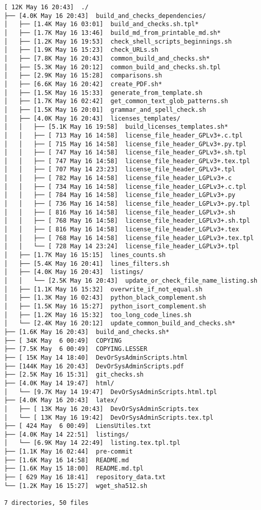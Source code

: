 \documentclass{article}
\begin{document}
\begin{verbatim}
[ 12K May 16 20:43]  ./
├── [4.0K May 16 20:43]  build_and_checks_dependencies/
│   ├── [1.4K May 16 03:01]  build_and_checks.sh.tpl*
│   ├── [1.7K May 16 13:46]  build_md_from_printable_md.sh*
│   ├── [1.2K May 16 19:53]  check_shell_scripts_beginnings.sh
│   ├── [1.9K May 16 15:23]  check_URLs.sh
│   ├── [7.8K May 16 20:43]  common_build_and_checks.sh*
│   ├── [5.3K May 16 20:12]  common_build_and_checks.sh.tpl
│   ├── [2.9K May 16 15:28]  comparisons.sh
│   ├── [6.6K May 16 20:42]  create_PDF.sh*
│   ├── [1.5K May 16 15:33]  generate_from_template.sh
│   ├── [1.7K May 16 02:42]  get_common_text_glob_patterns.sh
│   ├── [1.5K May 16 20:01]  grammar_and_spell_check.sh
│   ├── [4.0K May 16 20:43]  licenses_templates/
│   │   ├── [5.1K May 16 19:58]  build_licenses_templates.sh*
│   │   ├── [ 713 May 16 14:58]  license_file_header_GPLv3+.c.tpl
│   │   ├── [ 715 May 16 14:58]  license_file_header_GPLv3+.py.tpl
│   │   ├── [ 747 May 16 14:58]  license_file_header_GPLv3+.sh.tpl
│   │   ├── [ 747 May 16 14:58]  license_file_header_GPLv3+.tex.tpl
│   │   ├── [ 707 May 14 23:23]  license_file_header_GPLv3+.tpl
│   │   ├── [ 782 May 16 14:58]  license_file_header_LGPLv3+.c
│   │   ├── [ 734 May 16 14:58]  license_file_header_LGPLv3+.c.tpl
│   │   ├── [ 784 May 16 14:58]  license_file_header_LGPLv3+.py
│   │   ├── [ 736 May 16 14:58]  license_file_header_LGPLv3+.py.tpl
│   │   ├── [ 816 May 16 14:58]  license_file_header_LGPLv3+.sh
│   │   ├── [ 768 May 16 14:58]  license_file_header_LGPLv3+.sh.tpl
│   │   ├── [ 816 May 16 14:58]  license_file_header_LGPLv3+.tex
│   │   ├── [ 768 May 16 14:58]  license_file_header_LGPLv3+.tex.tpl
│   │   └── [ 728 May 14 23:24]  license_file_header_LGPLv3+.tpl
│   ├── [1.7K May 16 15:15]  lines_counts.sh
│   ├── [5.4K May 16 20:41]  lines_filters.sh
│   ├── [4.0K May 16 20:43]  listings/
│   │   └── [2.5K May 16 20:43]  update_or_check_file_name_listing.sh
│   ├── [1.1K May 16 15:32]  overwrite_if_not_equal.sh
│   ├── [1.3K May 16 02:43]  python_black_complement.sh
│   ├── [1.5K May 16 15:27]  python_isort_complement.sh
│   ├── [1.2K May 16 15:32]  too_long_code_lines.sh
│   └── [2.4K May 16 20:12]  update_common_build_and_checks.sh*
├── [1.6K May 16 20:43]  build_and_checks.sh*
├── [ 34K May  6 00:49]  COPYING
├── [7.5K May  6 00:49]  COPYING.LESSER
├── [ 15K May 14 18:40]  DevOrSysAdminScripts.html
├── [144K May 16 20:43]  DevOrSysAdminScripts.pdf
├── [2.5K May 16 15:31]  git_checks.sh
├── [4.0K May 14 19:47]  html/
│   └── [9.7K May 14 19:47]  DevOrSysAdminScripts.html.tpl
├── [4.0K May 16 20:43]  latex/
│   ├── [ 13K May 16 20:43]  DevOrSysAdminScripts.tex
│   └── [ 13K May 16 19:42]  DevOrSysAdminScripts.tex.tpl
├── [ 424 May  6 00:49]  LiensUtiles.txt
├── [4.0K May 14 22:51]  listings/
│   └── [6.9K May 14 22:49]  listing.tex.tpl.tpl
├── [1.1K May 16 02:44]  pre-commit
├── [1.6K May 16 14:58]  README.md
├── [1.6K May 15 18:00]  README.md.tpl
├── [ 629 May 16 18:41]  repository_data.txt
└── [1.2K May 16 15:27]  wget_sha512.sh

7 directories, 50 files
\end{verbatim}
\end{document}
